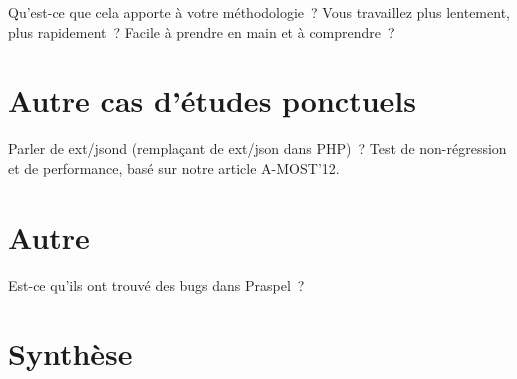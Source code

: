 Qu'est-ce que cela apporte à votre méthodologie~? Vous travaillez plus
lentement, plus rapidement~? Facile à prendre en main et à comprendre~?

\section{Autre cas d'études ponctuels}

Parler de ext/jsond (remplaçant de ext/json dans PHP)~? Test de non-régression
et de performance, basé sur notre article A-MOST'12.

\section{Autre}

Est-ce qu'ils ont trouvé des bugs dans Praspel~?

\section{Synthèse}
\label{section:experimentation:other}
